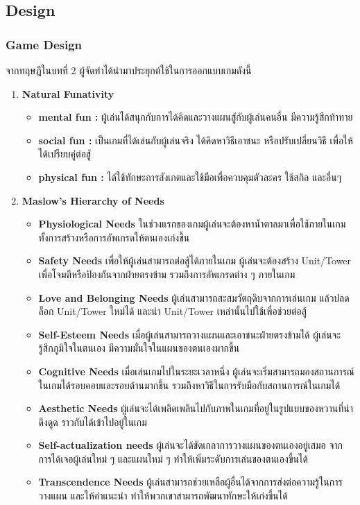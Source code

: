 \documentclass[12pt,oneside,openright,a4paper]{cpe-thai-project}
\begin{document}
\subsection{Design}

\subsubsection{Game Design}
จากทฤษฎีในบทที่ 2 ผู้จัดทำได้นำมาประยุกต์ใช้ในการออกแบบเกมดังนี้

\begin{enumerate}
  \item \textbf{Natural Funativity}
  \begin{itemize}
    \item \textbf{mental fun :} ผู้เล่นได้สนุกกับการได้คิดและวางแผนสู้กับผู้เล่นคนอื่น มีความรู้สึกท้าทาย
    \item \textbf{social fun :} เป็นเกมที่ได้เล่นกับผู้เล่นจริง ได้คิดหาวิธีเอาชนะ หรือปรับเปลี่ยนวิธี
    เพื่อให้ได้เปรียบคู่ต่อสู้
    \item \textbf{physical fun :} ได้ใช้ทักษะการสังเกตและใช้มือเพื่อควบคุมตัวละคร ใช้สกิล และอื่นๆ
  \end{itemize}

  \pagebreak
  \item \textbf{Maslow’s Hierarchy of Needs}
  \begin{itemize}
    \item \textbf{Physiological Needs} ในช่วงแรกของเกมผู้เล่นจะต้องหาน้ำตาลมาเพื่อใช้ภายในเกม 
      ทั้งการสร้างหรือการอัพเกรดให้ตนเองเก่งขึ้น	
    \item \textbf{Safety Needs} เพื่อให้ผู้เล่นสามารถต่อสู้ได้ภายในเกม ผู้เล่นจะต้องสร้าง Unit/Tower 
      เพื่อโจมตีหรือป้องกันจากฝ่ายตรงข้าม รวมถึงการอัพเกรดต่าง ๆ ภายในเกม
    \item \textbf{Love and Belonging Needs} ผู้เล่นสามารถสะสมวัตถุดิบจากการเล่นเกม 
      แล้วปลดล็อก Unit/Tower ใหม่ได้ และนำ Unit/Tower เหล่านั้นไปใช้เพื่อช่วยต่อสู้
    \item \textbf{Self-Esteem Needs} เมื่อผู้เล่นสามารถวางแผนและเอาชนะฝ่ายตรงข้ามได้ 
      ผู้เล่นจะรู้สึกภูมิใจในตนเอง มีความมั่นใจในแผนของตนเองมากขึ้น
    \item \textbf{Cognitive Needs} เมื่อเล่นเกมไปในระยะเวลาหนึ่ง 
      ผู้เล่นจะเริ่มสามารถมองสถานการณ์ในเกมได้รอบคอบและรอบด้านมากขึ้น 
      รวมถึงหาวิธีในการรับมือกับสถานการณ์ในเกมได้
    \item \textbf{Aesthetic Needs} ผู้เล่นจะได้เพลิดเพลินไปกับภาพในเกมที่อยู่ในรูปแบบของหวานที่น่าดึงดูด 
      ราวกับได้เข้าไปอยู่ในเกม
    \item \textbf{Self-actualization needs} ผู้เล่นจะได้ขัดเกลาการวางแผนของตนเองอยู่เสมอ 
      จากการได้เจอผู้เล่นใหม่ ๆ และแผนใหม่ ๆ ทำให้เพิ่มระดับการเล่นของตนเองขึ้นได้
    \item \textbf{Transcendence Needs} ผู้เล่นสามารถช่วยเหลือผู้อื่นได้จากการส่งต่อความรู้ในการวางแผน
      และให้คำแนะนำ ทำให้พวกเขาสามารถพัฒนาทักษะให้เก่งขึ้นได้
  \end{itemize}


\end{enumerate}
\end{document}
